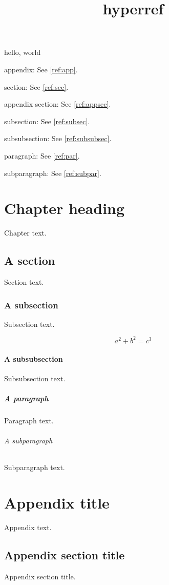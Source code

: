\documentclass{amsbook}
\title{hyperref}
\begin{document}
hello, world


appendix: See \autoref{ref:app}.

section: See \autoref{ref:sec}.

appendix section: See \autoref{ref:appsec}.

subsection: See \autoref{ref:subsec}.

subsubsection: See \autoref{ref:subsubsec}.

paragraph: See \autoref{ref:par}.

subparagraph: See \autoref{ref:subpar}.

\newpage

\chapter{Chapter heading}
\label{ref:chap}

Chapter text.

\section{A section}
\label{ref:sec}

Section text.

\subsection{A subsection}
\label{ref:subsec}

Subsection text.

\begin{equation}\label{ref:equation}
a^2 + b^2 = c^3
\end{equation}

\subsubsection{A subsubsection}
\label{ref:subsubsec}

Subsubsection text.

\paragraph{A paragraph}
\label{ref:par}

Paragraph text.

\subparagraph{A subparagraph}
\label{ref:subpar}

Subparagraph text.

\appendix

\chapter{Appendix title}
\label{ref:app}

Appendix text.

\section{Appendix section title}
\label{ref:appsec}

Appendix section title.
\end{document}
